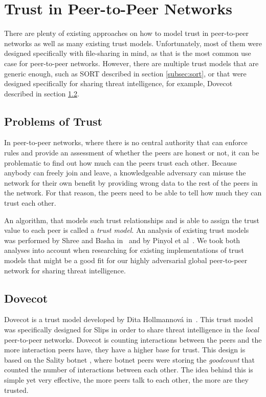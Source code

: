 \section{Trust in Peer-to-Peer Networks}
\label{sec:trust-in-p2p}

There are plenty of existing approaches on how to model trust in peer-to-peer networks as well as many existing trust models.
Unfortunately, most of them were designed specifically with file-sharing in mind, as that is the most common use case for peer-to-peer networks.
However, there are multiple trust models that are generic enough, such as SORT described in section \ref{subsec:sort}, or that were designed specifically for sharing threat intelligence, for example, Dovecot described in section \ref{subsec:dovecot}.

\subsection{Problems of Trust}
\label{subsec:problems-of-trust}
In peer-to-peer networks, where there is no central authority that can enforce rules and provide an assessment of whether the peers are honest or not, it can be problematic to find out how much can the peers trust each other.
Because anybody can freely join and leave, a knowledgeable adversary can misuse the network for their own benefit by providing wrong data to the rest of the peers in the network.
For that reason, the peers need to be able to tell how much they can trust each other. 

An algorithm, that models such trust relationships and is able to assign the trust value to each peer is called a \textit{trust model}.
An analysis of existing trust models was performed by Shree and Basha in~\cite{shree2014exhaustive} and by Pinyol et al~\cite{pinyol2013computational}. 
We took both analyses into account when researching for existing implementations of trust models that might be a good fit for our highly adversarial global peer-to-peer network for sharing threat intelligence.

\subsection{Dovecot}
\label{subsec:dovecot}
Dovecot is a trust model developed by Dita Hollmannová in~\cite{dita}.
This trust model was specifically designed for Slips in order to share threat intelligence in the \textit{local} peer-to-peer networks.
Dovecot is counting interactions between the peers and the more interaction peers have, they have a higher base for trust.
This design is based on the Sality botnet \cite{falliere2011sality}, where botnet peers were storing the \textit{goodcount} that counted the number of interactions between each other.
The idea behind this is simple yet very effective, the more peers talk to each other, the more are they trusted.

